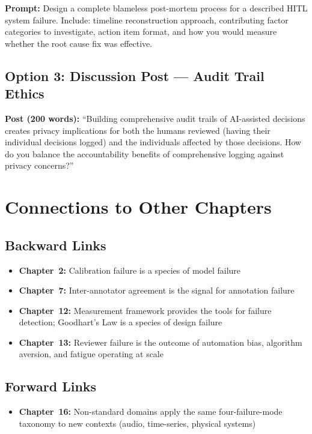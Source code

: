 \textbf{Prompt:} Design a complete blameless post-mortem process for a described HITL system failure. Include: timeline reconstruction approach, contributing factor categories to investigate, action item format, and how you would measure whether the root cause fix was effective.

\subsection{Option 3: Discussion Post --- Audit Trail Ethics}

\textbf{Post (200 words):} ``Building comprehensive audit trails of AI-assisted decisions creates privacy implications for both the humans reviewed (having their individual decisions logged) and the individuals affected by those decisions. How do you balance the accountability benefits of comprehensive logging against privacy concerns?''

\section{Connections to Other Chapters}

\subsection{Backward Links}
\begin{itemize}
    \item \textbf{Chapter~2:} Calibration failure is a species of model failure
    \item \textbf{Chapter~7:} Inter-annotator agreement is the signal for annotation failure
    \item \textbf{Chapter~12:} Measurement framework provides the tools for failure detection; Goodhart's Law is a species of design failure
    \item \textbf{Chapter~13:} Reviewer failure is the outcome of automation bias, algorithm aversion, and fatigue operating at scale
\end{itemize}

\subsection{Forward Links}
\begin{itemize}
    \item \textbf{Chapter~16:} Non-standard domains apply the same four-failure-mode taxonomy to new contexts (audio, time-series, physical systems)
\end{itemize}

